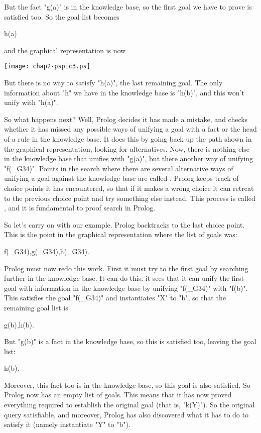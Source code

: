 But the fact "g(a)" is in the knowledge base, so the first goal we
have to prove is satisfied too. So the goal list becomes
\begin{LPNcodedisplay}
h(a)
\end{LPNcodedisplay}
%
and the graphical representation is now
%
\begin{center}
\texttt{[image: chap2-pspic3.ps]}
\end{center}
%
But there is no way to satisfy "h(a)", the last remaining goal.  The
only information about "h" we have in the knowledge base is "h(b)",
and this won't unify with "h(a)".

So what happens next? Well, Prolog decides it has made a mistake, and
checks whether it has missed any possible ways of unifying a goal with
a fact or the head of a rule in the knowledge base. It does this by
going back up the path shown in the graphical representation, looking
for alternatives. Now, there is nothing else in the knowledge base
that unifies with "g(a)", but there  another way of
unifying "f(\_G34)".  Points in the search where there are several
alternative ways of unifying a goal against the knowledge base are
called .  Prolog keeps track of choice points it
has encountered, so that if it makes a wrong choice it can retreat to
the previous choice point and try something else instead. This process
is called , and it is fundamental to proof search
in Prolog.

So let's carry on with our example.
Prolog backtracks to the last choice point. This is the
point in the graphical representation where the list of goals was:
\begin{LPNcodedisplay}
f(_G34),g(_G34),h(_G34).
\end{LPNcodedisplay}
Prolog must now redo this work.  First it must try to
 the first goal  by searching further in the
knowledge base.  It can do this: it sees that it can unify the first
goal with information in the knowledge base by unifying "f(\_G34)" with
"f(b)". This satisfies the goal "f(\_G34)" and instantiates "X" to "b",
so that the remaining goal list is
\begin{LPNcodedisplay}
g(b),h(b).
\end{LPNcodedisplay}
But "g(b)" is a fact in the knowledge base, so this is satisfied too,
leaving the goal list:
\begin{LPNcodedisplay}
h(b).
\end{LPNcodedisplay}
Moreover, this fact too is in the knowledge base, so this goal is also
satisfied. So Prolog now has an empty list of goals.  This means that
it has now proved everything required to establish the original goal
(that is, "k(Y)"). So the original query  satisfiable, and
moreover, Prolog has also discovered what it has to do to satisfy it
(namely instantiate "Y" to "b").


